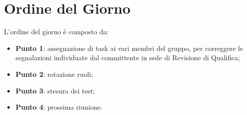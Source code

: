 \section{Ordine del Giorno}
L'ordine del giorno è composto da: 
\begin{itemize}
	\item \textbf{Punto 1}: assegnazione di task ai vari membri del gruppo, per correggere le
	segnalazioni individuate dal committente in sede di Revisione di Qualifica;
	\item \textbf{Punto 2}: rotazione ruoli; 
	\item \textbf{Punto 3}: stesura dei test;
	\item \textbf{Punto 4}: prossima riunione.
\end{itemize}